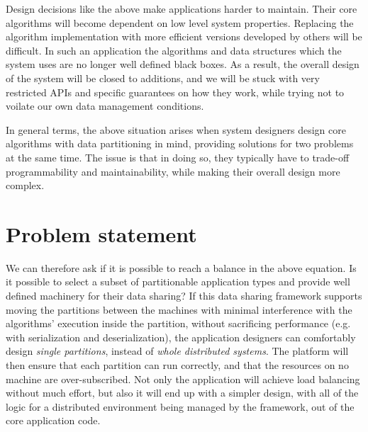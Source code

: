 Design decisions like the above make applications harder to maintain. Their
core algorithms will become dependent on low level system properties.
Replacing the
algorithm implementation with more efficient versions developed by others will
be difficult. In such an application
the algorithms and data structures which the system uses are no longer well
defined black boxes. As a result, the overall design of the system will be
closed to additions, and we will be stuck with very restricted APIs and specific
guarantees on how they work, while trying not to voilate our own data management
conditions.

In general terms, the above situation arises when system designers design
core algorithms with data partitioning in mind, providing solutions for two
problems at the same time. The issue is that in doing so, they typically have to
trade-off programmability and maintainability, while making their overall design
more complex.

\section{Problem statement}

We can therefore ask if it is possible to reach a balance in the above equation.
Is it possible to select a subset of partitionable application types
and provide well defined machinery for their data sharing? If this data sharing
framework supports moving the partitions between the machines with minimal
interference with the algorithms' execution inside the partition, without
sacrificing performance (e.g. with serialization and deserialization), the
application designers can comfortably design \emph{single partitions}, instead
of \emph{whole distributed systems}. The platform will then ensure that each
partition can run correctly, and that the resources on no machine are
over-subscribed. Not only the application will achieve load balancing without
much effort,
but also it will end up with a simpler design, with all
of the logic for a distributed environment being managed by the framework,
out of the core application code.

